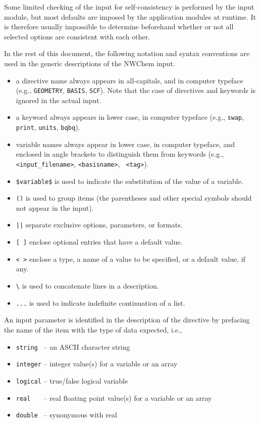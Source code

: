 Some limited checking of the input for self-consistency is performed
by the input module, but most defaults are imposed by the application
modules at runtime.  It is therefore usually impossible to determine
beforehand whether or not all selected options are consistent with
each other.

\sloppy

In the rest of this document, the following notation and syntax
conventions are used in the generic descriptions of the NWChem input.
\begin{itemize}
\item a directive name always appears in all-capitals, and in computer
  typeface (e.g., \verb+GEOMETRY+, \verb+BASIS+, \verb+SCF+).  Note
  that the case of directives and keywords is ignored in the actual
  input.
\item a keyword always appears in lower case, in computer typeface
  (e.g., {\tt swap}, {\tt print}, {\tt units}, {\tt bqbq}).
\item variable names always appear in lower case, in computer
  typeface, and enclosed in angle brackets to distinguish them from
  keywords (e.g., {\tt <input\_filename>}, {\tt <basisname>}, {\tt
    <tag>}).
\item \verb+$variable$+ is used to indicate the substitution of the
  value of a variable.
\item \verb+()+ is used to group items (the parentheses and other
  special symbols should not appear in the input).
\item \verb+||+ separate exclusive options, parameters, or formats.
\item \verb+[ ]+ enclose optional entries that have a default value.
\item \verb+< >+ enclose a type, a name of a value to be specified, or
  a default value, if any.
\item \verb+\+ is used to concatenate lines in a description.
\item \verb+...+ is used to indicate indefinite continuation of a
  list.
\end{itemize}

\fussy

An input parameter is identified in the description of the directive
by prefacing the name of the item with the type of data expected,
i.e.,
\begin{itemize}
\item \verb+string +  -- an ASCII character string
\item \verb+integer+ --  integer value(s) for a variable or an array
\item \verb+logical+ --  true/false logical variable
\item \verb+real   +  -- real floating point value(s) for a variable or an array
\item \verb+double + -- synonymous with real
\end{itemize}

